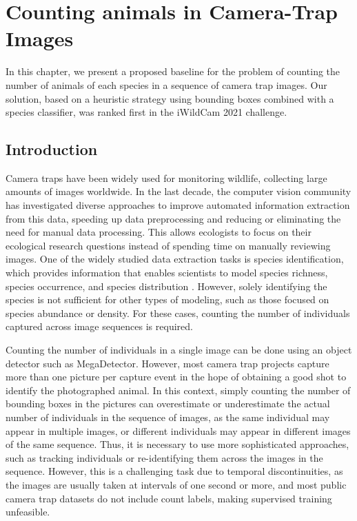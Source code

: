 \chapter{Counting animals in Camera-Trap Images}\label{cap:counting}

In this chapter, we present a proposed baseline for the problem of counting the
number of animals of each species in a sequence of camera trap images. Our
solution, based on a heuristic strategy using bounding boxes combined with a
species classifier, was ranked first in the iWildCam 2021 challenge.

\section{Introduction}

Camera traps have been widely used for monitoring wildlife, collecting large
amounts of images worldwide. In the last decade, the computer vision community
has investigated diverse approaches to improve automated information extraction
from this data, speeding up data preprocessing and reducing or eliminating the
need for manual data processing. This allows ecologists to focus on their
ecological research questions instead of spending time on manually reviewing
images. One of the widely studied data extraction tasks is species
identification, which provides information that enables scientists to model
species richness, species occurrence, and species distribution
\citep{beery2021iwildcam}. However, solely identifying the species is not
sufficient for other types of modeling, such as those focused on species
abundance or density. For these cases, counting the number of individuals
captured across image sequences is required.

Counting the number of individuals in a single image can be done using an
object detector such as MegaDetector. However, most camera trap projects
capture more than one picture per capture event in the hope of obtaining a good
shot to identify the photographed animal. In this context, simply counting the
number of bounding boxes in the pictures can overestimate or underestimate the
actual number of individuals in the sequence of images, as the same
individual may appear in multiple images, or different individuals may appear
in different images of the same sequence. Thus, it is necessary to use more
sophisticated approaches, such as tracking individuals or re-identifying them
across the images in the sequence. However, this is a challenging task due to
temporal discontinuities, as the images are usually taken at intervals of one
second or more, and most public camera trap datasets do not include count
labels, making supervised training unfeasible.

